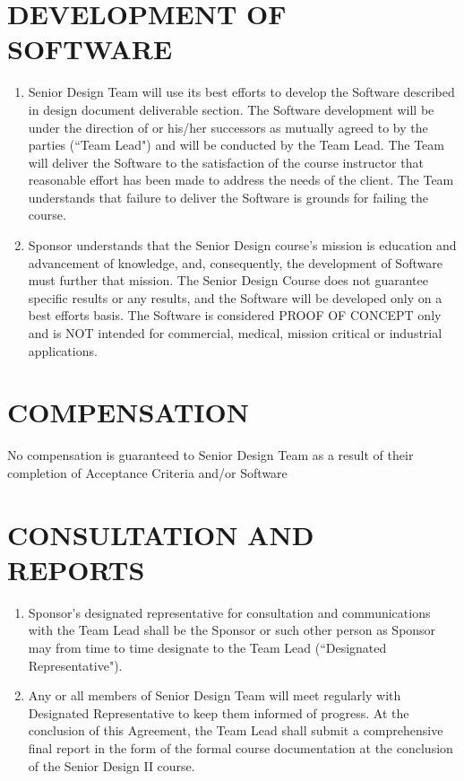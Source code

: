 \documentclass[11pt]{article}
\begin{document}
\section{DEVELOPMENT OF SOFTWARE }
\begin{enumerate}  \itemsep4pt \parskip0pt 
\item  Senior Design Team will use its best efforts to develop the Software described in design document deliverable section. The Software development will be under the direction of  or his/her successors as mutually agreed to by the parties (``Team Lead") and will be conducted by the Team Lead.  The Team will deliver the Software to the satisfaction of the course instructor that reasonable effort has been made to address the needs of the client.  The Team understands that failure to deliver the Software is grounds for failing the course. 

\item  Sponsor understands that the Senior Design course's mission is education and advancement of knowledge, and, consequently, the development of Software must further that mission. The Senior Design Course does not guarantee specific results or any results, and the Software will be developed only on a best efforts basis.  The Software is considered PROOF OF CONCEPT only and is NOT intended for commercial, medical, mission critical or industrial applications.
\end{enumerate}

\section{COMPENSATION}

No compensation is guaranteed to Senior Design Team as a result of their completion of Acceptance Criteria and/or Software

\section{CONSULTATION AND REPORTS}     
\begin{enumerate}  \itemsep4pt \parskip0pt 
\item  Sponsor's designated representative for consultation and       communications with the Team Lead shall be the Sponsor or such other person as Sponsor may from time to time designate to the Team Lead (``Designated Representative").      

\item Any or all members of Senior Design Team will meet regularly with Designated Representative to keep them informed of progress. At the conclusion of this Agreement, the Team Lead shall submit a comprehensive final report in the form of the formal course documentation at the conclusion of the Senior Design II course. 
\end{enumerate}
\end{document}
